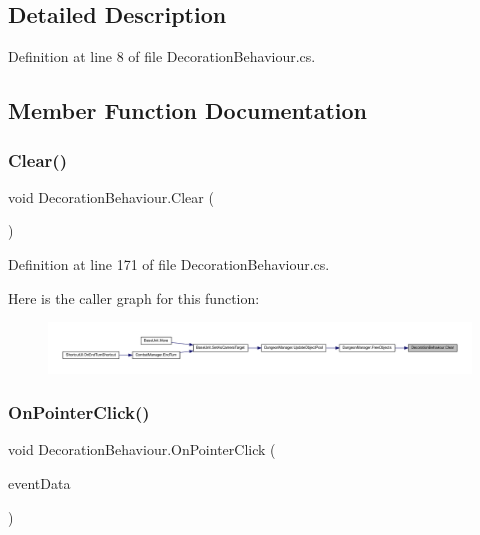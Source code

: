 \subsection{Detailed Description}


Definition at line 8 of file Decoration\+Behaviour.\+cs.



\subsection{Member Function Documentation}
\mbox{\label{class_decoration_behaviour_aab39ad5614d361801ffc9168a830c3d7}} 
\subsubsection{\texorpdfstring{Clear()}{Clear()}}
{\footnotesize\ttfamily void Decoration\+Behaviour.\+Clear (\begin{DoxyParamCaption}{ }\end{DoxyParamCaption})}



Definition at line 171 of file Decoration\+Behaviour.\+cs.

Here is the caller graph for this function\+:
\nopagebreak
\begin{figure}[H]
\begin{center}
\leavevmode
\includegraphics[width=350pt]{class_decoration_behaviour_aab39ad5614d361801ffc9168a830c3d7_icgraph}
\end{center}
\end{figure}
\mbox{\label{class_decoration_behaviour_a94a1b5e492f096e3f121d05105e16c37}} 
\subsubsection{\texorpdfstring{OnPointerClick()}{OnPointerClick()}}
{\footnotesize\ttfamily void Decoration\+Behaviour.\+On\+Pointer\+Click (\begin{DoxyParamCaption}\item[{Pointer\+Event\+Data}]{event\+Data }\end{DoxyParamCaption})}



